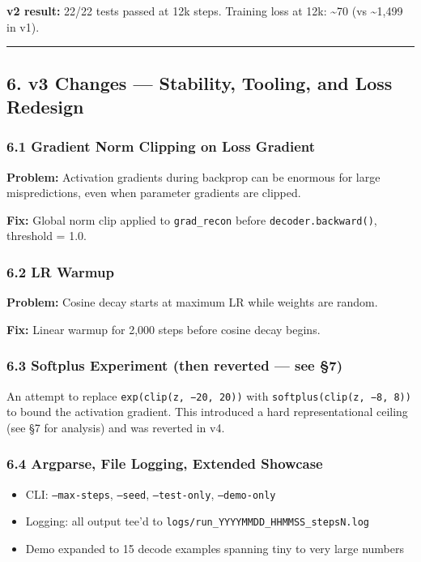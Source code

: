 \documentclass[11pt]{article}
\begin{document}
\textbf{v2 result:} 22/22 tests passed at 12k steps. Training loss at 12k: \textasciitilde{}70 (vs \textasciitilde{}1,499 in v1).


\noindent\rule{\textwidth}{0.4pt}


\subsection*{6. v3 Changes — Stability, Tooling, and Loss Redesign}


\subsubsection*{6.1 Gradient Norm Clipping on Loss Gradient}


\textbf{Problem:} Activation gradients during backprop can be enormous for large mispredictions, even when parameter gradients are clipped.


\textbf{Fix:} Global norm clip applied to \texttt{grad\_recon} before \texttt{decoder.backward()}, threshold = 1.0.


\subsubsection*{6.2 LR Warmup}


\textbf{Problem:} Cosine decay starts at maximum LR while weights are random.


\textbf{Fix:} Linear warmup for 2,000 steps before cosine decay begins.


\subsubsection*{6.3 Softplus Experiment (then reverted — see §7)}


An attempt to replace \texttt{exp(clip(z, −20, 20))} with \texttt{softplus(clip(z, −8, 8))} to bound the activation gradient. This introduced a hard representational ceiling (see §7 for analysis) and was reverted in v4.


\subsubsection*{6.4 Argparse, File Logging, Extended Showcase}


\begin{itemize}
\item CLI: \texttt{--max-steps}, \texttt{--seed}, \texttt{--test-only}, \texttt{--demo-only}
\item Logging: all output tee'd to \texttt{logs/run\_YYYYMMDD\_HHMMSS\_stepsN.log}
\item Demo expanded to 15 decode examples spanning tiny to very large numbers
\end{itemize}
\end{document}
